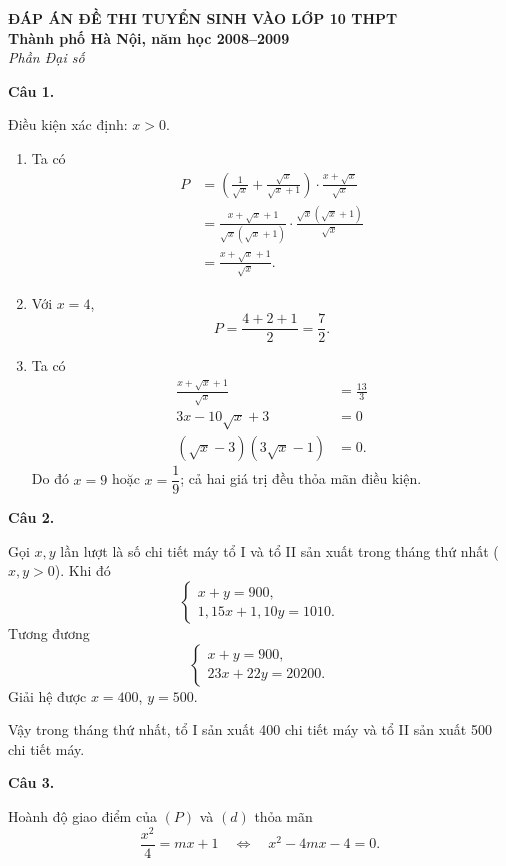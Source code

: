 \documentclass[12pt,a4paper]{article}
\begin{document}
\begin{center}
  {\Large\bfseries ĐÁP ÁN ĐỀ THI TUYỂN SINH VÀO LỚP 10 THPT}\\
  {\bfseries Thành phố Hà Nội, năm học 2008--2009}\\
  {\itshape Phần Đại số}
\end{center}

\textbf{Câu 1.}

Điều kiện xác định: $x>0$.

\begin{enumerate}[label=\alph*)]
  \item Ta có
  \begin{align*}
  P&=\left(\frac{1}{\sqrt{x}}+\frac{\sqrt{x}}{\sqrt{x}+1}\right)
  \cdot\frac{x+\sqrt{x}}{\sqrt{x}}\\
  &=\frac{x+\sqrt{x}+1}{\sqrt{x}(\sqrt{x}+1)}
  \cdot\frac{\sqrt{x}(\sqrt{x}+1)}{\sqrt{x}}\\
  &=\frac{x+\sqrt{x}+1}{\sqrt{x}}.
  \end{align*}

  \item Với $x=4$,
  \[
  P=\frac{4+2+1}{2}=\frac{7}{2}.
  \]

  \item Ta có
  \begin{align*}
  \frac{x+\sqrt{x}+1}{\sqrt{x}}&=\frac{13}{3}\\
  3x-10\sqrt{x}+3&=0\\
  (\sqrt{x}-3)(3\sqrt{x}-1)&=0.
  \end{align*}
  Do đó $x=9$ hoặc $x=\dfrac{1}{9}$; cả hai giá trị đều thỏa mãn điều kiện.
\end{enumerate}

\textbf{Câu 2.}

Gọi $x,y$ lần lượt là số chi tiết máy tổ I và tổ II sản xuất trong tháng thứ nhất ($x,y>0$). Khi đó
\[
\begin{cases}
x+y=900,\\
1{,}15x+1{,}10y=1010.
\end{cases}
\]
Tương đương
\[
\begin{cases}
x+y=900,\\
23x+22y=20200.
\end{cases}
\]
Giải hệ được $x=400$, $y=500$.

Vậy trong tháng thứ nhất, tổ I sản xuất 400 chi tiết máy và tổ II sản xuất 500 chi tiết máy.

\textbf{Câu 3.}

Hoành độ giao điểm của $(P)$ và $(d)$ thỏa mãn
\[
\frac{x^2}{4}=mx+1
\quad\Longleftrightarrow\quad
x^2-4mx-4=0. \tag{1}
\]
\end{document}
